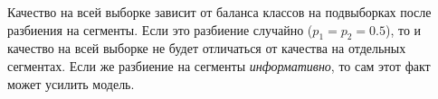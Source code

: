 \documentclass[12pt,fleqn]{article}
\begin{document}
\begin{esSolution}
        Качество на всей выборке зависит от баланса классов на подвыборках после разбиения на сегменты.
        Если это разбиение случайно ($p_1 = p_2 = 0.5$), то и качество на всей выборке не будет отличаться от качества на отдельных сегментах.
        Если же разбиение на сегменты \textit{информативно}, то сам этот факт может усилить модель.
    \end{esSolution}
\end{document}
